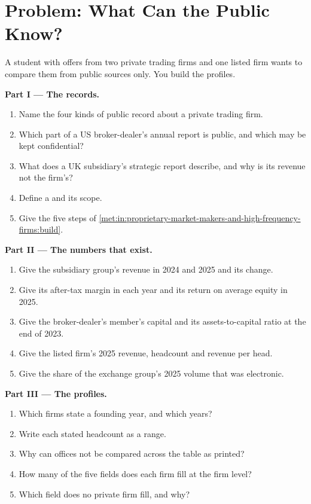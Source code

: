 \section{Problem: What Can the Public Know?}

\begin{problem}\label{pb:in:proprietary-market-makers-and-high-frequency-firms:1}
A student with offers from two private trading firms and one listed firm wants to compare them from public sources
only. You build the profiles.

\medskip\noindent\textbf{Part I --- The records.}
\begin{enumerate}
\item Name the four kinds of public record about a private trading firm.
\item Which part of a US broker-dealer's annual report is public, and which may be kept confidential?
\item What does a UK subsidiary's strategic report describe, and why is its revenue not the firm's?
\item Define a  and its scope.
\item Give the five steps of \cref{met:in:proprietary-market-makers-and-high-frequency-firms:build}.
\end{enumerate}

\medskip\noindent\textbf{Part II --- The numbers that exist.}
\begin{enumerate}[resume]
\item Give the subsidiary group's revenue in 2024 and 2025 and its change.
\item Give its after-tax margin in each year and its return on average equity in 2025.
\item Give the broker-dealer's member's capital and its assets-to-capital ratio at the end of 2023.
\item Give the listed firm's 2025 revenue, headcount and revenue per head.
\item Give the share of the exchange group's 2025 volume that was electronic.
\end{enumerate}

\medskip\noindent\textbf{Part III --- The profiles.}
\begin{enumerate}[resume]
\item Which firms state a founding year, and which years?
\item Write each stated headcount as a range.
\item Why can offices not be compared across the table as printed?
\item How many of the five fields does each firm fill at the firm level?
\item Which field does no private firm fill, and why?
\end{enumerate}


\end{problem}
